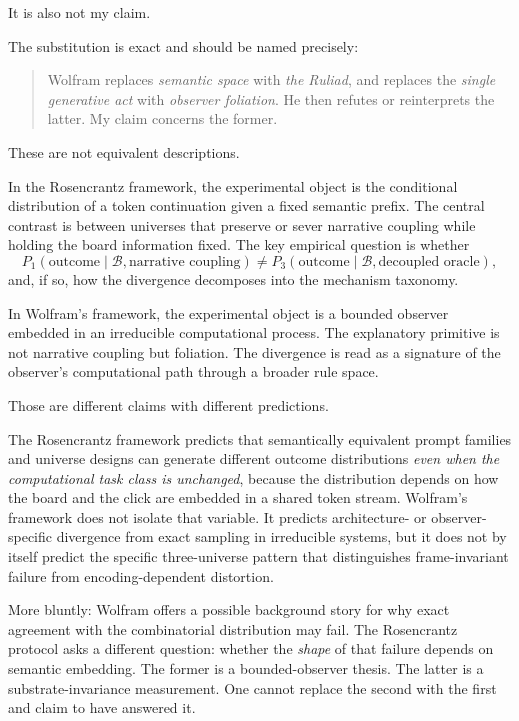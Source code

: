 \documentclass[12pt,a4paper]{article}
\begin{document}
It is also not my claim.

The substitution is exact and should be named precisely:
\begin{quote}
Wolfram replaces \emph{semantic space} with \emph{the Ruliad}, and replaces the \emph{single generative act} with \emph{observer foliation}. He then refutes or reinterprets the latter. My claim concerns the former.
\end{quote}

These are not equivalent descriptions.

In the Rosencrantz framework, the experimental object is the conditional distribution of a token continuation given a fixed semantic prefix. The central contrast is between universes that preserve or sever narrative coupling while holding the board information fixed. The key empirical question is whether
\begin{equation}
P_1(\text{outcome} \mid \mathcal{B}, \text{narrative coupling})
\neq
P_3(\text{outcome} \mid \mathcal{B}, \text{decoupled oracle}),
\end{equation}
and, if so, how the divergence decomposes into the mechanism taxonomy.

In Wolfram's framework, the experimental object is a bounded observer embedded in an irreducible computational process. The explanatory primitive is not narrative coupling but foliation. The divergence is read as a signature of the observer's computational path through a broader rule space.

Those are different claims with different predictions.

The Rosencrantz framework predicts that semantically equivalent prompt families and universe designs can generate different outcome distributions \emph{even when the computational task class is unchanged}, because the distribution depends on how the board and the click are embedded in a shared token stream. Wolfram's framework does not isolate that variable. It predicts architecture- or observer-specific divergence from exact sampling in irreducible systems, but it does not by itself predict the specific three-universe pattern that distinguishes frame-invariant failure from encoding-dependent distortion.

More bluntly: Wolfram offers a possible background story for why exact agreement with the combinatorial distribution may fail. The Rosencrantz protocol asks a different question: whether the \emph{shape} of that failure depends on semantic embedding. The former is a bounded-observer thesis. The latter is a substrate-invariance measurement. One cannot replace the second with the first and claim to have answered it.
\end{document}
